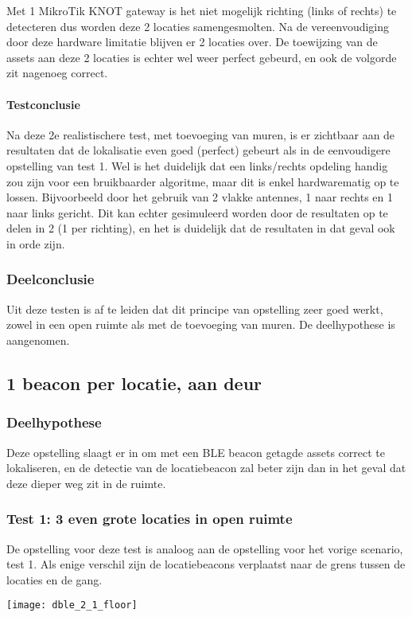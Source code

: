 Met 1 MikroTik KNOT gateway is het niet mogelijk richting (links of rechts) te detecteren dus worden deze 2 locaties samengesmolten. Na de vereenvoudiging door deze hardware limitatie blijven er 2 locaties over. De toewijzing van de assets aan deze 2 locaties is echter wel weer perfect gebeurd, en ook de volgorde zit nagenoeg correct.

\paragraph{Testconclusie}
Na deze 2e realistischere test, met toevoeging van muren, is er zichtbaar aan de resultaten dat de lokalisatie even goed (perfect) gebeurt als in de eenvoudigere opstelling van test 1. Wel is het duidelijk dat een links/rechts opdeling handig zou zijn voor een bruikbaarder algoritme, maar dit is enkel hardwarematig op te lossen. Bijvoorbeeld door het gebruik van 2 vlakke antennes, 1 naar rechts en 1 naar links gericht. Dit kan echter gesimuleerd worden door de resultaten op te delen in 2 (1 per richting), en het is duidelijk dat de resultaten in dat geval ook in orde zijn.

\subsubsection{Deelconclusie}
Uit deze testen is af te leiden dat dit principe van opstelling zeer goed werkt, zowel in een open ruimte als met de toevoeging van muren. De deelhypothese is aangenomen.
	

\subsection{1 beacon per locatie, aan deur}
\subsubsection{Deelhypothese}
Deze opstelling slaagt er in om met een BLE beacon getagde assets correct te lokaliseren, en de detectie van de locatiebeacon zal beter zijn dan in het geval dat deze dieper weg zit in de ruimte.

\subsubsection{Test 1: 3 even grote locaties in open ruimte}
\begin{minipage}{0.55\textwidth}
De opstelling voor deze test is analoog aan de opstelling voor het vorige scenario, test 1. Als enige verschil zijn de locatiebeacons verplaatst naar de grens tussen de locaties en de gang.
\end{minipage}
\hfill
\begin{minipage}{0.42\textwidth}
	\texttt{[image: dble\_2\_1\_floor]}
\end{minipage}

